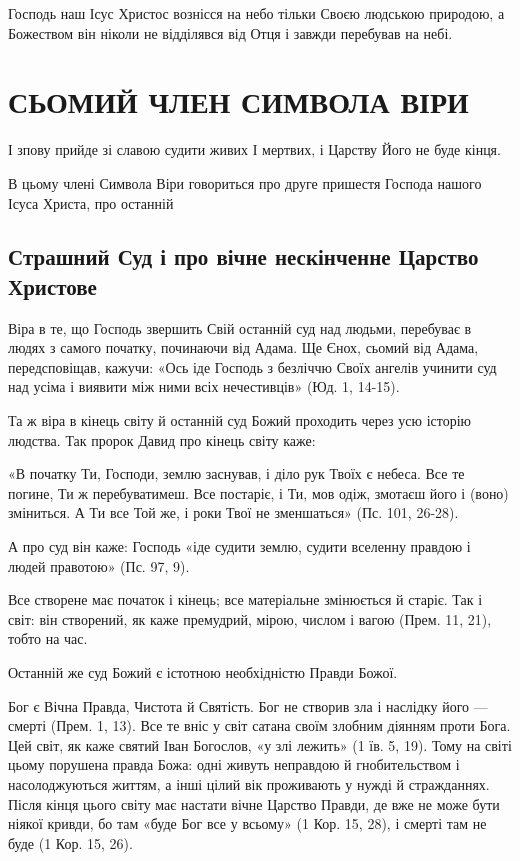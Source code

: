 \documentclass[main.tex]{subfiles}
\begin{document}
Господь наш Ісус Христос вознісся на небо тільки Своєю людською природою, а Божеством він ніколи не відділявся від Отця і завжди перебував на небі.

\section{СЬОМИЙ ЧЛЕН СИМВОЛА ВІРИ}

І зпову прийде зі славою судити живих І мертвих, і Царству Його не буде кінця.

В цьому члені Символа Віри говориться про друге пришестя Господа нашого Ісуса Христа, про останній
 
\subsection{Страшний Суд і про вічне нескінченне Царство Христове}

Віра в те, що Господь звершить Свій останній суд над людьми, перебуває в людях з самого початку, починаючи від Адама. Ще Єнох, сьомий від Адама, передсповіщав, кажучи: «Ось іде Господь з безліччю Своїх ангелів учинити суд над усіма і виявити між ними всіх нечестивців» (Юд. 1, 14-15).

Та ж віра в кінець світу й останній суд Божий проходить через усю історію людства. Так пророк Давид про кінець світу каже:

«В початку Ти, Господи, землю заснував, і діло рук Твоїх є небеса. Все те погине, Ти ж перебуватимеш. Все постаріє, і Ти, мов одіж, змотаєш його і (воно) зміниться. А Ти все Той же, і роки Твої не зменшаться» (Пс. 101, 26-28).

А про суд він каже: Господь «іде судити землю, судити вселенну правдою і людей правотою» (Пс. 97, 9).

Все створене має початок і кінець; все матеріальне змінюється й старіє. Так і світ: він створений, як каже премудрий, мірою, числом і вагою (Прем. 11, 21), тобто на час.

Останній же суд Божий є істотною необхідністю Правди Божої.

Бог є Вічна Правда, Чистота й Святість. Бог не створив зла і наслідку його — смерті (Прем. 1, 13). Все те вніс у світ сатана своїм злобним діянням проти Бога. Цей світ, як каже святий Іван Богослов, «у злі лежить» (1 їв. 5, 19). Тому на світі цьому порушена правда Божа: одні живуть неправдою й гнобительством і насолоджуються життям, а інші цілий вік проживають у нужді й стражданнях. Після кінця цього світу має настати вічне Царство Правди, де вже не може бути ніякої кривди, бо там «буде Бог все у всьому» (1 Кор. 15, 28), і смерті там не буде (1 Кор. 15, 26).
\end{document}
